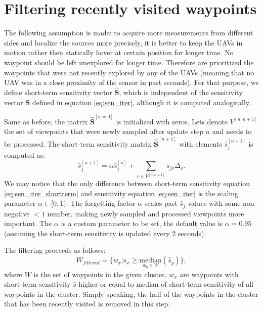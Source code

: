 \section{Filtering recently visited waypoints}%
The following assumption is made:
to acquire more measurements from different sides and localize the sources more precisely, it is better to keep the \ac{UAV}s in motion rather then statically hover at certain position for longer time.
No waypoint should be left unexplored for longer time.
Therefore are prioritized the waypoints that were not recently explored by any of the \ac{UAV}s (meaning that no \ac{UAV} was in a close proximity of the sensor in past seconds).
For that purpose, we define short-term sensitivity vector $\mathbf{\hat{S}}$, which is independent of the sensitivity vector $\mathbf{S}$ defined in equation \autoref{eq:sen_iter}, 
although it is computed analogically.

Same as before, the matrix $\mathbf{\hat{S}}^{[n = 0]}$ is initialized with zeros.
Lets denote $V^{[n:n+1]}$ the set of viewpoints that were newly sampled after update step $n$ and needs to be processed. 
The short-term sensitivity matrix $\mathbf{\hat{S}}^{[n+1]}$ with elements $\hat{s}_{j}^{[n+1]}$ is computed as:
\begin{equation}
  \hat{s}_{j}^{[n+1]} = \alpha \hat{s}_{j}^{[n]} + \sum_{v \in V^{[n:n+1]}} s_{jv} \Delta_{v}. 
  \label{eq:sen_iter_shortterm}
\end{equation}
We may notice that the only difference between short-term sensitivity equation \autoref{eq:sen_iter_shortterm} and sensitivity equation \autoref{eq:sen_iter} is the scaling parameter $\alpha \in [0, 1)$.
The forgetting factor $\alpha$ scales past $\hat{s}_{j}$ values with some non-negative $<1$ number, making newly sampled and processed viewpoints more important.
The $\alpha$ is a custom parameter to be set, the default value is $\alpha = 0.95$ (assuming the short-term sensitivity is updated every $2$ seconds).%

The filtering proceeds as follows:
\begin{equation}
  W_{filtered} = \{w_{x} | \hat{s}_{x} \ge \underset{w_{y} \in W}{\mathrm{median}}(\hat{s}_{y})\},
\end{equation}
where $W$ is the set of waypoints in the given cluster, $w_{x}$ are waypoints with short-term sensitivity $\hat{s}$ higher or equal to median of short-term sensitivity of all waypoints in the cluster.
Simply speaking, the half of the waypoints in the cluster that has been recently visited is removed in this step.

